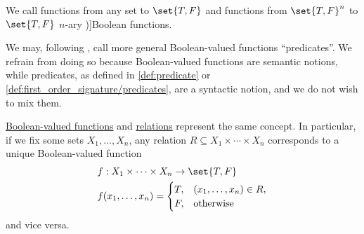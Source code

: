 \begin{definition}\label{def:boolean_function}
  We call functions from any set to \( \set{ T, F } \)  and functions from \( \set{ T, F }^n \) to \( \set{ T, F } \) \( n \)-ary \term[ru=булевые функции, en=Boolean functions (\cite[847]{Rosen2019DiscreteMathematics})]{Boolean functions}.
\end{definition}

\begin{remark}\label{rem:boolean_valued_functions_and_predicates}
  We may, following , call more general Boolean-valued functions \enquote{predicates}. We refrain from doing so because Boolean-valued functions are semantic notions, while predicates, as defined in \cref{def:predicate} or \cref{def:first_order_signature/predicates}, are a syntactic notion, and we do not wish to mix them.
\end{remark}

\begin{remark}\label{rem:boolean_valued_functions_and_predicates}
  \hyperref[def:boolean_function]{Boolean-valued functions} and \hyperref[def:relation]{relations} represent the same concept. In particular, if we fix some sets \( X_1, \ldots, X_n \), any relation \( R \subseteq X_1 \times \cdots \times X_n \) corresponds to a unique Boolean-valued function
  \begin{equation*}
    \begin{aligned}
      &f: X_1 \times \cdots \times X_n \to \set{ T, F } \\
      &f(x_1, \ldots, x_n) = \begin{cases}
        T, &(x_1, \ldots, x_n) \in R, \\
        F, &\T{otherwise}
      \end{cases}
    \end{aligned}
  \end{equation*}
  and vice versa.
\end{remark}

